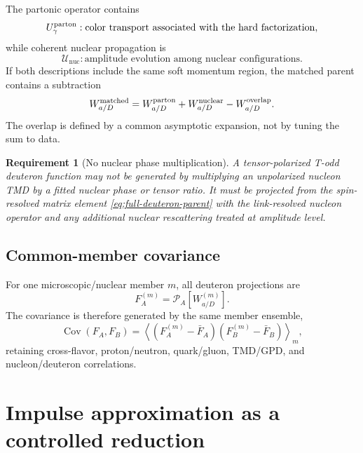 \documentclass[11pt]{article}
\newtheorem{requirement}[definition]{Requirement}
\newcommand{\cP}{\mathcal P}
\newcommand{\cU}{\mathcal U}
\newcommand{\nuc}{\mathrm{nuc}}
\begin{document}
The partonic operator contains
\begin{equation}
 U_\gamma^{\rm parton}:
 \text{color transport associated with the hard factorization},
\label{eq:partonic-wilson-object}
\end{equation}
while coherent nuclear propagation is
\begin{equation}
 \cU_{\nuc}:
 \text{amplitude evolution among nuclear configurations}.
\label{eq:nuclear-propagation-object}
\end{equation}
If both descriptions include the same soft momentum region, the matched
parent contains a subtraction
\begin{equation}
 W_{a/D}^{\rm matched}
 =W_{a/D}^{\rm parton}
 +W_{a/D}^{\rm nuclear}
 -W_{a/D}^{\rm overlap}.
\label{eq:parton-nuclear-overlap-subtraction}
\end{equation}
The overlap is defined by a common asymptotic expansion, not by tuning the
sum to data.

\begin{requirement}[No nuclear phase multiplication]
\label{req:no-nuclear-phase-multiplication-v4}
A tensor-polarized T-odd deuteron function may not be generated by multiplying
an unpolarized nucleon TMD by a fitted nuclear phase or tensor ratio.  It must
be projected from the spin-resolved matrix element
\cref{eq:full-deuteron-parent} with the link-resolved nucleon operator and any
additional nuclear rescattering treated at amplitude level.
\end{requirement}

\subsection{Common-member covariance}

For one microscopic/nuclear member \(m\), all deuteron projections are
\begin{equation}
 F_A^{(m)}=\cP_A[W_{a/D}^{(m)}].
\label{eq:member-projection}
\end{equation}
The covariance is therefore generated by the same member ensemble,
\begin{equation}
 \operatorname{Cov}(F_A,F_B)
 =\left\langle
 (F_A^{(m)}-\bar F_A)(F_B^{(m)}-\bar F_B)
 \right\rangle_m,
\label{eq:common-member-covariance}
\end{equation}
retaining cross-flavor, proton/neutron, quark/gluon, TMD/GPD, and
nucleon/deuteron correlations.

\section{Impulse approximation as a controlled reduction}
\label{sec:impulse}
\end{document}

